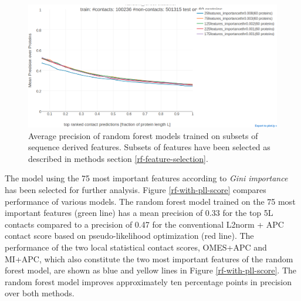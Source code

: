 \documentclass[12pt,a4paper,twoside]{book}
\theoremstyle{definition}
\theoremstyle{definition}
\theoremstyle{remark}
\begin{document}
\begin{figure}
\includegraphics[width=1\linewidth]{img/random_forest_contact_prior/precision_vs_rank_featureselectionrandom_forest_optimized_hyperparameters_25features} \caption{Average precision of
random forest models trained on subsets of sequence derived features.
Subsets of features have been selected as described in methods section
\ref{rf-feature-selection}.}\label{fig:rf-performance-feature-selection}
\end{figure}

The model using the 75 most important features according to \emph{Gini
importance} has been selected for further analysis. Figure
\ref{rf-with-pll-score} compares performance of various models. The
random forest model trained on the 75 most important features (green
line) has a mean precision of 0.33 for the top 5L contacts compared to a
precision of 0.47 for the conventional L2norm + APC contact score based
on pseudo-likelihood optimization (red line). The performance of the two
local statistical contact scores, OMES+APC and MI+APC, which also
constitute the two most important features of the random forest model,
are shown as blue and yellow lines in Figure \ref{rf-with-pll-score}.
The random forest model improves approximately ten percentage points in
precision over both methods.
\end{document}
